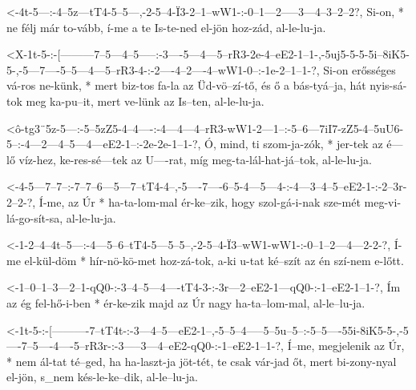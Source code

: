 
  {<-4t-5---:-4--5z---tT4-5--5---,-2-5--4-Ï3-2--1--wW1-:-0--1---2---–3---4--3--2--2?,}
  {  Si-on, * ne félj már to-vább, í-me a te Is-te-ned   el-jön hoz-zád, al-le-lu-ja.}




  {<X-1t-5-:-[---------7--5---4--5-----:-3----5---4---5--rR3-2e-4--eE2-1--1-,-5uj5-5-5-5i--8iK5-5-,-5---7----5--5---4---5--rR3-4-:-2----4--2----4--wW1-0--:-1e-2--1--1-?,}
  {   Si-on  erősséges vá-ros ne-künk, * mert biz-tos fa-la  az Üd-vö--zí-tő, és   ő a bás-tyá--ja, hát nyis-sá-tok meg ka-pu--it, mert ve-lünk az Is--ten, al-le-lu-ja.}

  {<ô-tg3¨5z-5---:-5--5zZ5-4--4----:-4---4---4--rR3-wW1-2---1--:-5--6---7iI7-zZ5-4--5uU6-5--:-4---2---4--5---4---eE2-1--:-2e-2e-1--1-?,}
  {   Ó,     mind, ti szom-ja-zók, * jer-tek az é---lő  víz-hez, ke-res-sé---tek az U----rat, míg meg-ta-lál-hat-já--tok, al-le-lu-ja.}

  {<-4-5---7--7--:-7--7--6---5---7--tT4-4--,-5----7----6--5-4---5---4-:-4---3--4--5--eE2-1-:-2--3r-2--2-?,}
  {  Í-me, az Úr * ha-ta-lom-mal ér-ke--zik, hogy szol-gá-i-nak sze-mét meg-vi-lá-go-sít-sa, al-le-lu-ja.}

  {<-1-2--4--4t--5---:-4---5--6--tT4-5---5--5--,-2-5--4-Ï3--wW1-wW1-:-0--1--2---4---2-2-?,}
  {  Í-me el-kül-döm * hír-nö-kö-met hoz-zá-tok, a-ki u-tat ké--szít  az én szí-nem e-lőtt.}


  {<-1--0--1--3---2--1-qQ0-:-3--4--5---4----tT4-3-:-3r---2--eE2-1---qQ0-:-1--eE2-1--1-?,}
  {  Ím az ég fel-hő-i-ben * ér-ke-zik majd az  Úr  nagy ha-ta--lom-mal,  al-le--lu-ja.}

  {<-1t-5-:-[----------7--tT4t-:-3---4--5---eE2-1--,-5--5--4-----5--5u--5--:-5--5----55i-8iK5-5-,-5----7--5----4----5--rR3r-:-3-----3---4--eE2-qQ0-:-1--eE2-1--1-?,}
  {  Í--me, megjelenik az Úr,  * nem ál-tat té--ged, ha ha-laszt-ja jöt-tét, te csak vár-jad  őt, mert bi-zony-nyal el-jön,   s_nem kés-le-ke--dik,  al-le--lu-ja.}

